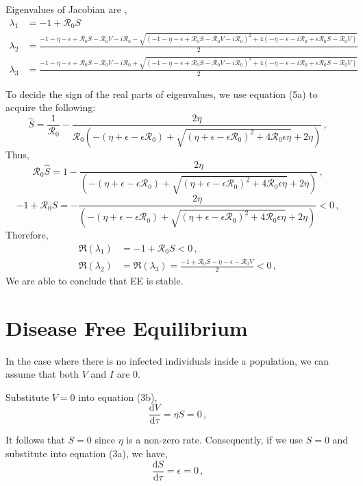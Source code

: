 \documentclass[12pt]{article}
\newcommand\dbyd[2]{\frac{\mathrm d{#1}}{\mathrm d{#2}}}
\newcommand{\R}{\mathcal{R}}
\begin{document}
Eigenvalues of Jacobian are ,
\begin{subequations}
\begin{align}
\lambda_1&=-1+\R_0 S\\
\lambda_2&=\frac{-1-\eta-\epsilon+\R_0 S-\R_0 V-i\R_0-\sqrt{(-1-\eta-\epsilon+\R_0 S-\R_0 V-i\R_0)^2+4(-\eta-\epsilon-i\R_0+\epsilon\R_0 S-\R_0 V)}}{2}\\
\lambda_3&=\frac{-1-\eta-\epsilon+\R_0 S-\R_0 V-i\R_0+\sqrt{(-1-\eta-\epsilon+\R_0 S-\R_0 V-i\R_0)^2+4(-\eta-\epsilon-i\R_0+\epsilon\R_0 S-\R_0 V)}}{2}
\end{align}
\end{subequations}

To decide the sign of the real parts of eigenvalues, we use equation (5a) to acquire the following:
\begin{equation}
\hat{S} = \frac{1}{\R_0}-\frac{2\eta}{\R_0(-(\eta+\epsilon-\epsilon\R_0)+\sqrt{(\eta+\epsilon-\epsilon\R_0)^2+4\R_0\epsilon \eta}+2\eta)}\,,
\end{equation}
Thus,
\begin{equation}
\R_0\hat{S}=1-\frac{2\eta}{(-(\eta+\epsilon-\epsilon\R_0)+\sqrt{(\eta+\epsilon-\epsilon\R_0)^2+4\R_0\epsilon \eta}+2\eta)}\,,
\end{equation}
\begin{equation}
-1+\R_0 S=-\frac{2\eta}{(-(\eta+\epsilon-\epsilon\R_0)+\sqrt{(\eta+\epsilon-\epsilon\R_0)^2+4\R_0\epsilon \eta}+2\eta)}<0\,,
\end{equation}
Therefore,
\begin{subequations}
\begin{align}
\Re(\lambda_1) &=-1+\R_0 S<0\,,\\
\Re(\lambda_2) &=\Re(\lambda_3)=\frac{-1+\R_0 S-\eta-\epsilon-\R_0 V}{2}<0\,,
\end{align}
\end{subequations}
We are able to conclude that EE is stable.

\section{Disease Free Equilibrium}
In the case where there is no infected individuals inside a population, we can assume that both $V$ and $I$ are 0.

Substitute $V=0$ into equation (3b),
\begin{equation}
\dbyd{V}{\tau}=\eta S =0\,,
\end{equation}

It follows that $S=0$ since $\eta$ is a non-zero rate. Consequently, if we use $S=0$ and substitute into equation (3a), we have,
\begin{equation}
\dbyd{S}{\tau}=\epsilon=0\,,
\end{equation}
\end{document}
